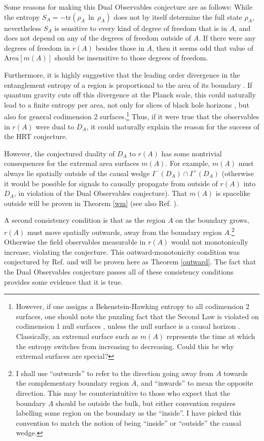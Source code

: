 \documentclass{article}
\begin{document}
Some reasons for making this Dual Observables conjecture are as follows:  While the entropy $S_A = -\mathrm{tr}(\rho_A\,\ln\,\rho_A)$ does not by itself determine the full state $\rho_A$, nevertheless $S_A$ is sensitive to every kind of degree of freedom that is in $A$, and does not depend on any of the degrees of freedom outside of $A$.   If there were any degrees of freedom in $r(A)$ besides those in $A$, then it seems odd that value of $\mathrm{Area}[m(A)]$ should be insensitive to those degrees of freedom.  

Furthermore, it is highly suggestive that the leading order divergence in the entanglement entropy of a region is proportional to the area of its boundary \cite{diverge}.  If quantum gravity cuts off this divergence at the Planck scale, this could naturally lead to a finite entropy per area, not only for slices of black hole horizons \cite{area}, but also for general codimension 2 surfaces.\footnote{However, if one assigns a Bekenstein-Hawking entropy to all codimension 2 surfaces, one should note the puzzling fact that the Second Law is violated on codimension 1 null surfaces \cite{10proofs}, unless the null surface is a causal horizon \cite{JP03}.  Classically, an extremal surface such as $m(A)$ represents the time at which the entropy switches from increasing to decreasing.  Could this be why extremal surfaces are special?} Thus, if it were true that the observables in $r(A)$ were dual to $D_A$, it could naturally explain the reason for the success of the HRT conjecture.

However, the conjectured duality of $D_A$ to $r(A)$ has some nontrivial consequences for the extremal area surfaces $m(A)$.  For example, $m(A)$ must always lie spatially outside of the causal wedge $I^-(D_A) \cap I^+(D_A)$ (otherwise it would be possible for signals to causally propagate from outside of $r(A)$ into $D_A$, in violation of the Dual Observables conjecture).  That $m(A)$ is spacelike outside will be proven in Theorem \ref{wm} (see also Ref. \cite{HR12}).

A second consistency condition is that as the region $A$ on the boundary grows, $r(A)$ must move spatially outwards, away from the boundary region $A$.\footnote{I shall use ``outwards'' to refer to the direction going away from $A$ towards the complementary boundary region $\overline{A}$, and ``inwards'' to mean the opposite direction.  This may be counterintuitive to those who expect that the boundary $A$ should be outside the bulk, but either convention requires labelling some region on the boundary as the ``inside''.  I have picked this convention to match the notion of being ``inside'' or ``outside'' the causal wedge.}  Otherwise the field observables measurable in $r(A)$ would not monotonically increase, violating the conjecture.  This outward-monotonicity condition was conjectured by Ref. \cite{CKNR12} and will be proven here as Theorem \ref{outward}.  The fact that the Dual Observables conjecture passes all of these consistency conditions provides some evidence that it is true.
\end{document}
